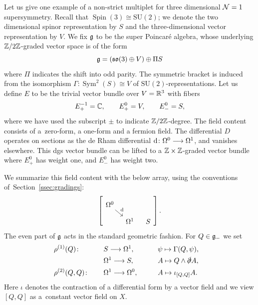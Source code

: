 \documentclass[pdftex]{sigma}
\numberwithin{equation}{section}
\def\lie#1{\ensuremath{\mathfrak{#1}}}
\def\so{\lie{so}}
\def\d{{\rm d}}
\DeclareMathOperator{\Spin}{Spin}
\DeclareMathOperator{\Sym}{Sym}
\begin{document}
\begin{eg}
	Let us give one example of a non-strict multiplet for three dimensional $\mathcal N=1$ supersymmetry. Recall that $\Spin(3) \cong \mathrm{SU}(2)$; we denote the two dimensional spinor representation by $S$ and the three-dimensional vector representation by $V$. We fix $\mathfrak g$ to be the super Poincar\'e algebra, whose underlying $\mathbb Z/2\mathbb Z$-graded vector space is of the form
	\begin{equation*}
	\fg = (\so(3) \oplus V) \oplus \Pi S
	\end{equation*}
	where $\Pi$ indicates the shift into odd parity. The symmetric bracket is induced from the isomorphism $\Gamma \colon\Sym^2(S) \cong V$ of $\mathrm{SU}(2)$-representations. Let us define $E$ to be the trivial vector bundle over $V = \mathbb R^3$ with fibers
	\begin{equation*}
	E^{-1}_+ = \mathbb C, \qquad E^0_+ = V, \qquad E^0_- = S ,
	\end{equation*}
	where we have used the subscript $\pm$ to indicate $\mathbb Z/2\mathbb Z$-degree. The field content consists of a~zero-form, a one-form and a fermion field. The differential $D$ operates on sections as the de Rham differential $\d\colon \Omega^0 \longrightarrow \Omega^1$, and vanishes elsewhere. This dgs vector bundle can be lifted to a $\mathbb Z \times \mathbb Z$-graded vector bundle where $E^0_+$ has weight one, and $E^0_-$ has weight two.
	
	We summarize this field content with the below array, using the conventions of~Section~\ref{ssec:gradings}:
	\begin{equation*}
	\left[
	\begin{tikzcd}[column sep = 0.3cm , row sep = 0.3cm]
	\Omega^0 \arrow[dr ,"\d"] & & \\
	& \Omega^1 & S
	\end{tikzcd} \right].
	\end{equation*}
	The even part of $\mathfrak g$ acts in the standard geometric fashion. For $Q\in \mathfrak g_-$ we set
	\begin{alignat*}{4}
	&\rho^{(1)}(Q) \colon \quad&& S \longrightarrow \Omega^1 ,\qquad&& \psi \mapsto \Gamma(Q,\psi),& \\
	&&& \Omega^1 \longrightarrow S ,\qquad&& A \mapsto Q \wedge \slashed{\partial} A,& \\
	&\rho^{(2)}(Q,Q) \colon\quad&& \Omega^1 \longrightarrow \Omega^0 ,\qquad&& A \mapsto \iota_{[Q, Q ]} A.&
	\end{alignat*}
	Here $\iota$ denotes the contraction of a differential form by a vector field and we view $[Q,Q]$ as a~constant vector field on $X$.
\end{eg}
\end{document}
